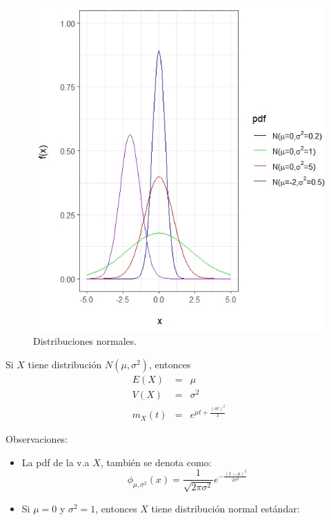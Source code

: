\begin{i}
\begin{figure}[h!]
\centering
\includegraphics[scale=1]{Figuras/Normales.jpeg}
\caption{Distribuciones normales.}
\end{figure}

\begin{theorem}
Si $X$ tiene distribución $N(\mu ,\sigma ^{2})$, entonces
\begin{eqnarray*}
E(X) &=&\mu \\
V(X) &=&\sigma ^{2} \\
m_{X}(t) &=&e^{\mu t+\frac{(\sigma t)^{2}}{2}}
\end{eqnarray*}
\end{theorem}

Observaciones:
\begin{itemize}
\item La pdf de la v.a $X$, también se denota como: 
\begin{equation*}
\phi _{\mu,\sigma ^{2}}(x)=\frac{1}{\sqrt{2\pi \sigma ^{2}}}e^{-\frac{
(x-\mu )^{2}}{2\sigma ^{2}}}
\end{equation*}
\end{itemize}

\begin{itemize}
\item Si $\mu =0$ y $\sigma ^{2}=1$, entonces $X$ tiene distribución normal estándar:
\end{itemize}


\end{i}
